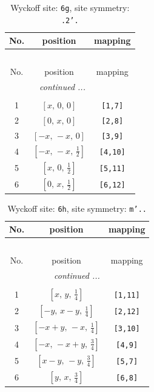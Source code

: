 \documentclass[fleqn,8pt]{jsarticle}
\begin{document}
\renewcommand{\arraystretch}{1.2}
\begin{longtable}{ccc}
\caption{Wyckoff site: {\tt 6g}, site symmetry: {\tt .2'.}}
 \\
 \hline \hline
No. & position & mapping \\ \hline \endfirsthead

\multicolumn{2}{l}{\tablename\ \thetable{}} \\
 \hline \hline
No. & position & mapping \\ \hline \endhead

 \hline \hline
\multicolumn{2}{r}{\footnotesize\it continued ...} \\ \endfoot

 \hline \hline
\multicolumn{2}{r}{} \\ \endlastfoot

1 & $\left[ x,\, 0,\, 0 \right]$ & {\tt [1,7]} \\ \hline
2 & $\left[ 0,\, x,\, 0 \right]$ & {\tt [2,8]} \\ \hline
3 & $\left[ - x,\, - x,\, 0 \right]$ & {\tt [3,9]} \\ \hline
4 & $\left[ - x,\, - x,\, \frac{1}{2} \right]$ & {\tt [4,10]} \\ \hline
5 & $\left[ x,\, 0,\, \frac{1}{2} \right]$ & {\tt [5,11]} \\ \hline
6 & $\left[ 0,\, x,\, \frac{1}{2} \right]$ & {\tt [6,12]} \\
\end{longtable}
\renewcommand{\arraystretch}{1.2}
\begin{longtable}{ccc}
\caption{Wyckoff site: {\tt 6h}, site symmetry: {\tt m'..}}
 \\
 \hline \hline
No. & position & mapping \\ \hline \endfirsthead

\multicolumn{2}{l}{\tablename\ \thetable{}} \\
 \hline \hline
No. & position & mapping \\ \hline \endhead

 \hline \hline
\multicolumn{2}{r}{\footnotesize\it continued ...} \\ \endfoot

 \hline \hline
\multicolumn{2}{r}{} \\ \endlastfoot

1 & $\left[ x,\, y,\, \frac{1}{4} \right]$ & {\tt [1,11]} \\ \hline
2 & $\left[ - y,\, x - y,\, \frac{1}{4} \right]$ & {\tt [2,12]} \\ \hline
3 & $\left[ - x + y,\, - x,\, \frac{1}{4} \right]$ & {\tt [3,10]} \\ \hline
4 & $\left[ - x,\, - x + y,\, \frac{3}{4} \right]$ & {\tt [4,9]} \\ \hline
5 & $\left[ x - y,\, - y,\, \frac{3}{4} \right]$ & {\tt [5,7]} \\ \hline
6 & $\left[ y,\, x,\, \frac{3}{4} \right]$ & {\tt [6,8]} \\
\end{longtable}
\end{document}
